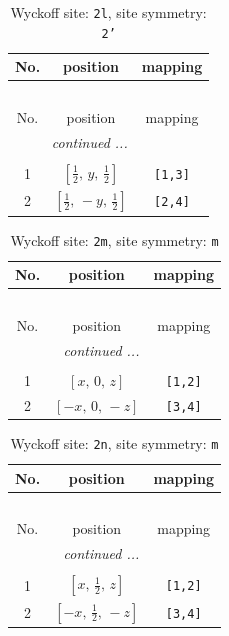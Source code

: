 \documentclass[fleqn,8pt]{jsarticle}
\begin{document}
\begin{longtable}{ccc}
\caption{Wyckoff site: {\tt 2l}, site symmetry: {\tt 2'}}
 \\
 \hline \hline
No. & position & mapping \\ \hline \endfirsthead

\multicolumn{2}{l}{\tablename\ \thetable{}} \\
 \hline \hline
No. & position & mapping \\ \hline \endhead

 \hline \hline
\multicolumn{2}{r}{\footnotesize\it continued ...} \\ \endfoot

 \hline \hline
\multicolumn{2}{r}{} \\ \endlastfoot

1 & $\left[ \frac{1}{2},\, y,\, \frac{1}{2} \right]$ & {\tt [1,3]} \\ \hline
2 & $\left[ \frac{1}{2},\, - y,\, \frac{1}{2} \right]$ & {\tt [2,4]} \\
\end{longtable}
\renewcommand{\arraystretch}{1.2}
\begin{longtable}{ccc}
\caption{Wyckoff site: {\tt 2m}, site symmetry: {\tt m}}
 \\
 \hline \hline
No. & position & mapping \\ \hline \endfirsthead

\multicolumn{2}{l}{\tablename\ \thetable{}} \\
 \hline \hline
No. & position & mapping \\ \hline \endhead

 \hline \hline
\multicolumn{2}{r}{\footnotesize\it continued ...} \\ \endfoot

 \hline \hline
\multicolumn{2}{r}{} \\ \endlastfoot

1 & $\left[ x,\, 0,\, z \right]$ & {\tt [1,2]} \\ \hline
2 & $\left[ - x,\, 0,\, - z \right]$ & {\tt [3,4]} \\
\end{longtable}
\renewcommand{\arraystretch}{1.2}
\begin{longtable}{ccc}
\caption{Wyckoff site: {\tt 2n}, site symmetry: {\tt m}}
 \\
 \hline \hline
No. & position & mapping \\ \hline \endfirsthead

\multicolumn{2}{l}{\tablename\ \thetable{}} \\
 \hline \hline
No. & position & mapping \\ \hline \endhead

 \hline \hline
\multicolumn{2}{r}{\footnotesize\it continued ...} \\ \endfoot

 \hline \hline
\multicolumn{2}{r}{} \\ \endlastfoot

1 & $\left[ x,\, \frac{1}{2},\, z \right]$ & {\tt [1,2]} \\ \hline
2 & $\left[ - x,\, \frac{1}{2},\, - z \right]$ & {\tt [3,4]} \\
\end{longtable}
\end{document}
